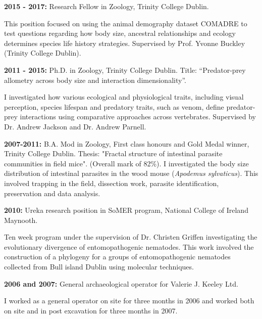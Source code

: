\documentclass[10pt,a4paper]{article}
\begin{document}
\raggedright	
\textbf{2015 - 2017:} Research Fellow in Zoology, Trinity College Dublin.
 \smallskip
\par{\fontsize{10.5}{10} This position focused on using the animal demography dataset COMADRE to test questions regarding how body size, ancestral relationships and ecology determines species life history strategies. Supervised by Prof. Yvonne Buckley (Trinity College Dublin).\bigskip}

\raggedright	
\textbf{2011 - 2015:} Ph.D. in Zoology, Trinity College Dublin. Title: “Predator-prey allometry across body size and interaction dimensionality”.\\ \par{\fontsize{10.5}{10} I investigated how various ecological and physiological traits, including visual perception, species lifespan and predatory traits, such as venom, define predator-prey interactions using comparative approaches across vertebrates. Supervised by Dr. Andrew Jackson and Dr. Andrew Parnell.
\bigskip}


\textbf{2007-2011:} B.A. Mod in Zoology, First class honours and Gold Medal winner, Trinity College Dublin.
Thesis: "Fractal structure of intestinal parasite communities in field mice". (Overall mark of 82\%).
I investigated the body size distribution of intestinal parasites in the wood mouse (\textit{Apodemus sylvaticus}). This involved trapping in the field, dissection work, parasite identification, preservation and data analysis.
\bigskip

\textbf{2010:} Ureka research position in SoMER program, National College of Ireland Maynooth.\\
\par{\fontsize{10.5}{10} Ten week program under the supervision of Dr. Christen Griffen investigating the evolutionary divergence of entomopathogenic nematodes. This work involved the construction of a phylogeny for a groups of entomopathogenic nematodes collected from Bull island Dublin using molecular techniques.}
\bigskip

\textbf{2006 and 2007:} General archaeological operator for Valerie J. Keeley Ltd.\\
\par{\fontsize{10.5}{10} I worked as a general operator on site for three months in 2006 and worked both on site
and in post excavation for three months in 2007.
}
\bigskip
\end{document}
